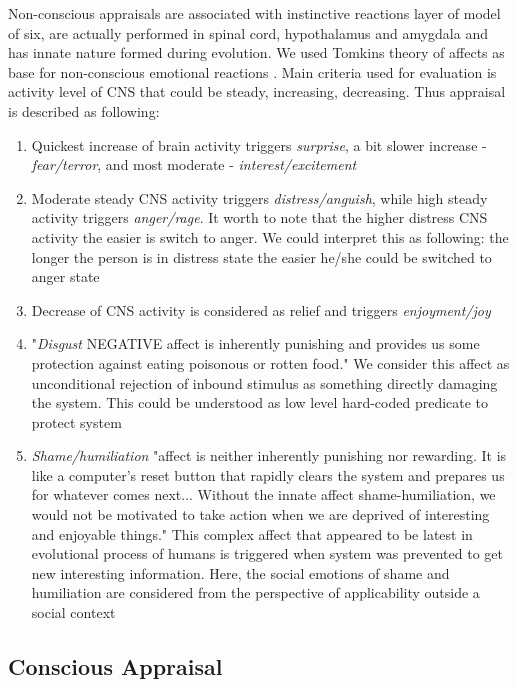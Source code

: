 Non-conscious appraisals are associated with instinctive reactions layer of model of six, are actually performed in spinal cord, hypothalamus and amygdala and has innate nature formed during evolution. We used Tomkins theory of affects as base for non-conscious emotional reactions \cite{primer_affect_psychology}. Main criteria used for evaluation is activity level of CNS that could be steady, increasing, decreasing. Thus appraisal is described as following:

\begin{enumerate}
 \item  Quickest increase of brain activity triggers \emph{surprise}, a bit slower increase - \emph{fear/terror}, and most moderate - \emph{interest/excitement}
 \item  Moderate steady CNS activity triggers \emph{distress/anguish}, while high steady activity triggers \emph{anger/rage}. It worth to note that the higher distress CNS activity the easier is switch to anger. We could interpret this as following: the longer the person is in distress state the easier he/she could be switched to anger state
 \item  Decrease of CNS activity is considered as relief and triggers \emph{enjoyment/joy}
 \item  "\emph{Disgust} NEGATIVE affect is inherently punishing and provides us some protection against eating poisonous or rotten food." We consider this affect as unconditional rejection of inbound stimulus as something directly damaging the system. This could be understood as low level hard-coded predicate to protect system
 \item  \emph{Shame/humiliation} "affect is neither inherently punishing nor rewarding. It is like a computer’s reset button that rapidly clears the system and prepares us for whatever comes next... Without the innate affect shame-humiliation, we would not be motivated to take action when we are deprived of interesting and enjoyable things." This complex affect that appeared to be latest in evolutional process of humans is triggered when system was prevented to get new interesting information. Here, the social emotions of shame and humiliation are considered from the perspective of applicability outside a social context
\end{enumerate}

\subsection{Conscious Appraisal}

